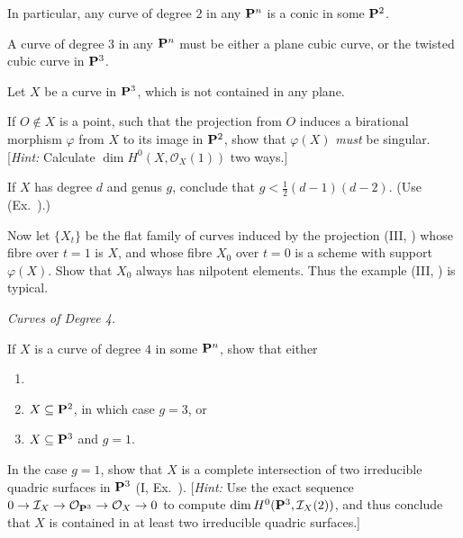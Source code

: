 {{\begin{description}[style=multiline,labelwidth=1.9em,leftmargin=2.2em,itemsep=4pt,topsep=0pt,parsep=0pt]
\begin{parts}
\item In particular, any curve of degree $2$ in any $\mathbf{P}^n$ is a conic in some $\mathbf{P}^2$.
\item A curve of degree $3$ in any $\mathbf{P}^n$ must be either a plane cubic curve, or the twisted cubic curve in $\mathbf{P}^3$.
\end{parts}
\item[\hypertarget{ex-IV-3.5}{}3.5.] Let $X$ be a curve in $\mathbf{P}^3$, which is not contained in any plane.
\begin{parts}
\item If $O\notin X$ is a point, such that the projection from $O$ induces a birational morphism $\varphi$ from $X$ to its image in $\mathbf{P}^2$, show that $\varphi(X)$ \emph{must} be singular. [\emph{Hint:} Calculate $\dim H^0(X,\mathcal O_X(1))$ two ways.]
\item If $X$ has degree $d$ and genus $g$, conclude that $g<\frac12(d-1)(d-2)$. (Use (Ex.~).)
\item Now let $\{X_t\}$ be the flat family of curves induced by the projection (III, ) whose fibre over $t=1$ is $X$, and whose fibre $X_0$ over $t=0$ is a scheme with support $\varphi(X)$. Show that $X_0$ always has nilpotent elements. Thus the example (III, ) is typical.
\end{parts}
\item[\hypertarget{ex-IV-3.6}{}3.6.] \emph{Curves of Degree 4.}
\begin{parts}
\item If $X$ is a curve of degree $4$ in some $\mathbf{P}^n$, show that either
\begin{enumerate}[label=(\arabic*),leftmargin=1.65em,itemsep=0pt,topsep=2pt,parsep=0pt]
\item {}
\item $X\subseteq\mathbf{P}^2$, in which case $g=3$, or
\item $X\subseteq\mathbf{P}^3$ and $g=1$.
\end{enumerate}
\item In the case $g=1$, show that $X$ is a complete intersection of two irreducible quadric surfaces in $\mathbf{P}^3$ (I, Ex.~). [\emph{Hint:} Use the exact sequence $0\to\mathcal I_X\to\mathcal O_{\mathbf{P}^3}\to\mathcal O_X\to0$ to compute $\dim H^0(\mathbf{P}^3,\mathcal I_X(2))$, and thus conclude that $X$ is contained in at least two irreducible quadric surfaces.]
\end{parts}
\end{description}
}
}
